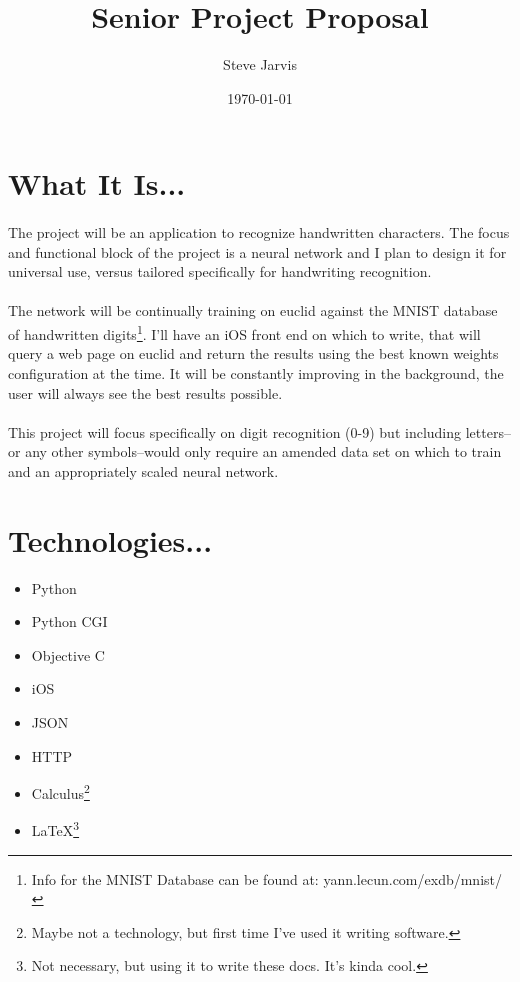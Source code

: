 \documentclass{article}
\title{Senior Project Proposal}
\author{Steve Jarvis}
\date{\today}
\begin{document}
\maketitle

\section{What It Is...}
	\paragraph{}The project will be an application to recognize handwritten characters.  The
	focus and functional block of the project is a neural network and I plan to 
	design it for universal use, versus tailored specifically for handwriting 
	recognition.
	\paragraph{}The network will be continually training on euclid against the MNIST database
	of handwritten digits\footnote{Info for the MNIST Database can be found at: 
	yann.lecun.com/exdb/mnist/}. I'll have an iOS front end on which to write, 
	that will query a web page on euclid and return the results using the best 
	known weights configuration at the time. It will be constantly improving in 
	the background, the user will always see the best results possible.
	\paragraph{}This project will focus specifically on digit recognition (0-9) but including 
	letters--or any other symbols--would only require an amended data set on which
	to train and an appropriately scaled neural network.
	
\section{Technologies...}
	\begin{itemize}  pt
		\item Python
		\item Python CGI
		\item Objective C
		\item iOS
		\item JSON
		\item HTTP
		\item Calculus\footnote{Maybe not a technology, but first time I’ve used it writing software.}
		\item \LaTeX\footnote{Not necessary, but using it to write these docs. It's kinda cool.}
	\end{itemize}
	
\end{document}
